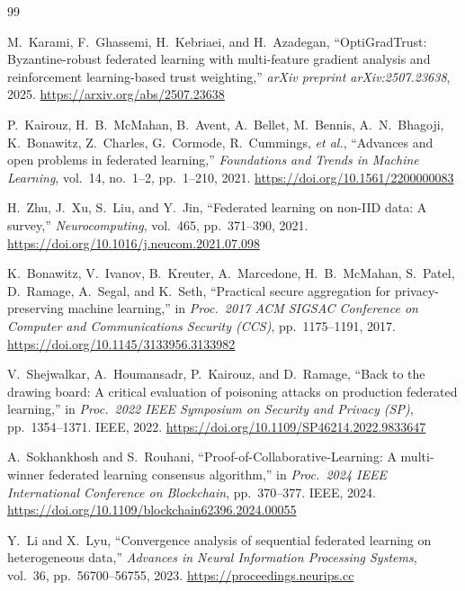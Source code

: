\documentclass[12pt,a4paper]{article}
\begin{document}
\begin{thebibliography}{99}

M.~Karami, F.~Ghassemi, H.~Kebriaei, and H.~Azadegan,
``OptiGradTrust: Byzantine-robust federated learning with multi-feature gradient
analysis and reinforcement learning-based trust weighting,''
\textit{arXiv preprint arXiv:2507.23638}, 2025.
\url{https://arxiv.org/abs/2507.23638}

P.~Kairouz, H.~B.~McMahan, B.~Avent, A.~Bellet, M.~Bennis, A.~N.~Bhagoji,
K.~Bonawitz, Z.~Charles, G.~Cormode, R.~Cummings, \emph{et al.},
``Advances and open problems in federated learning,''
\textit{Foundations and Trends in Machine Learning}, vol.~14, no.~1--2, pp.~1--210,
2021.
\url{https://doi.org/10.1561/2200000083}

H.~Zhu, J.~Xu, S.~Liu, and Y.~Jin,
``Federated learning on non-IID data: A survey,''
\textit{Neurocomputing}, vol.~465, pp.~371--390, 2021.
\url{https://doi.org/10.1016/j.neucom.2021.07.098}

K.~Bonawitz, V.~Ivanov, B.~Kreuter, A.~Marcedone, H.~B.~McMahan, S.~Patel,
D.~Ramage, A.~Segal, and K.~Seth,
``Practical secure aggregation for privacy-preserving machine learning,''
in \textit{Proc.\ 2017 ACM SIGSAC Conference on Computer and Communications
Security (CCS)}, pp.~1175--1191, 2017.
\url{https://doi.org/10.1145/3133956.3133982}

V.~Shejwalkar, A.~Houmansadr, P.~Kairouz, and D.~Ramage,
``Back to the drawing board: A critical evaluation of poisoning attacks on production
federated learning,''
in \textit{Proc.\ 2022 IEEE Symposium on Security and Privacy (SP)},
pp.~1354--1371. IEEE, 2022.
\url{https://doi.org/10.1109/SP46214.2022.9833647}

A.~Sokhankhosh and S.~Rouhani,
``Proof-of-Collaborative-Learning: A multi-winner federated learning consensus
algorithm,''
in \textit{Proc.\ 2024 IEEE International Conference on Blockchain},
pp.~370--377. IEEE, 2024.
\url{https://doi.org/10.1109/blockchain62396.2024.00055}

Y.~Li and X.~Lyu,
``Convergence analysis of sequential federated learning on heterogeneous data,''
\textit{Advances in Neural Information Processing Systems}, vol.~36,
pp.~56700--56755, 2023.
\url{https://proceedings.neurips.cc}


\end{thebibliography}
\end{document}
